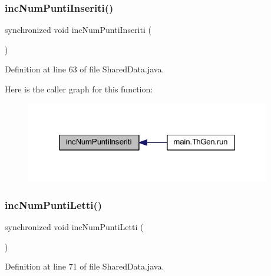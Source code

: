 \subsubsection{\texorpdfstring{inc\+Num\+Punti\+Inseriti()}{incNumPuntiInseriti()}}
{\footnotesize\ttfamily synchronized void inc\+Num\+Punti\+Inseriti (\begin{DoxyParamCaption}{ }\end{DoxyParamCaption})}



Definition at line 63 of file Shared\+Data.\+java.

Here is the caller graph for this function\+:
\nopagebreak
\begin{figure}[H]
\begin{center}
\leavevmode
\includegraphics[width=303pt]{classmain_1_1_shared_data_a34af1e216aea720d07a45ca716b8893b_icgraph}
\end{center}
\end{figure}
\mbox{\label{classmain_1_1_shared_data_aa3c9cc591cbe753063e4dd75f20cfade}} 
\subsubsection{\texorpdfstring{inc\+Num\+Punti\+Letti()}{incNumPuntiLetti()}}
{\footnotesize\ttfamily synchronized void inc\+Num\+Punti\+Letti (\begin{DoxyParamCaption}{ }\end{DoxyParamCaption})}



Definition at line 71 of file Shared\+Data.\+java.

